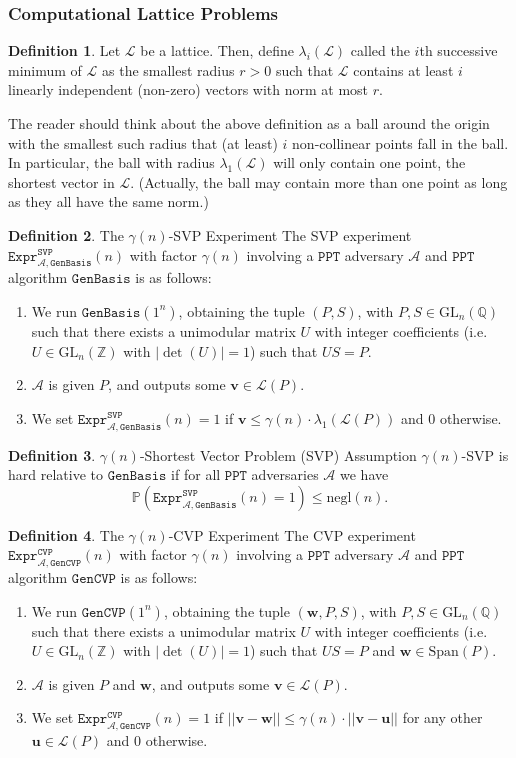 \documentclass{article}
\theoremstyle{definition}
\newtheorem{definition}{Definition}[section]
\theoremstyle{example}
\newcommand{\A}{\mathcal{A}}
\renewcommand{\L}{\mathcal{L}}
\newcommand{\Prob}{\mathbb{P}}
\newcommand{\Int}{\mathbb{Z}}
\newcommand{\Rat}{\mathbb{Q}}
\newcommand{\GL}{\text{GL}}
\newcommand{\Span}{\text{Span}}
\newcommand{\PPT}{\texttt{PPT}}
\newcommand{\negl}{\text{negl}}
\newcommand{\Expr}[2]{\texttt{Expr}^{\texttt{#1}}_{#2}}
\newcommand{\GenBasis}{\texttt{GenBasis}}
\newcommand{\GenCVP}{\texttt{GenCVP}}
\renewcommand{\vec}[1]{\mathbf{#1}}
\newcommand{\norm}[1]{||#1||}
\begin{document}
\subsubsection{Computational Lattice Problems}
\label{sec:comp_lattice_prob}
\begin{definition}
  Let $\L$ be a lattice. Then, define $\lambda_i(\L)$ called the $i$th
  successive minimum of $\L$ as the smallest radius $r > 0 $ such that $\L$
  contains at least $i$ linearly independent (non-zero) vectors with norm at most $r$.
\end{definition}
The reader should think about the above definition as a ball around the origin
with the smallest such radius that (at least) $i$ non-collinear points fall in
the ball. In particular, the ball with radius $\lambda_1(\L)$ will only contain
one point, the shortest vector in $\L$. (Actually, the ball may contain more
than one point as long as they all have the same norm.)
\begin{definition}{The $\gamma(n)$-SVP Experiment} The SVP experiment
  $\Expr{SVP}{\A, \GenBasis}(n)$ with factor $\gamma(n)$ involving a $\PPT$ adversary $\A$ and
  $\PPT$ algorithm $\GenBasis$ is as follows:
  \begin{enumerate}
  \item We run $\GenBasis(1^n)$, obtaining the tuple $(P, S)$, with $P, S \in
    \GL_n(\Rat)$ such that there exists a unimodular matrix $U$ with integer
    coefficients (i.e. $U \in \GL_n(\Int)$ with $|\det(U)| = 1$) such that $US =
    P$.
  \item $\A$ is given $P$, and outputs some $\vec{v} \in \L(P)$.
  \item We set $\Expr{SVP}{\A, \GenBasis}(n) = 1$ if $\vec{v} \leq \gamma(n)
    \cdot \lambda_1(\L(P))$ and $0$ otherwise.
  \end{enumerate}
\end{definition}
\begin{definition}{$\gamma(n)$-Shortest Vector Problem (SVP) Assumption}
  $\gamma(n)$-SVP is hard relative to $\GenBasis$ if for all $\PPT$ adversaries $\A$ we
  have
  \[
    \Prob(\Expr{SVP}{\A, \GenBasis}(n) = 1) \leq \negl(n).
  \]
\end{definition}
\begin{definition}{The $\gamma(n)$-CVP Experiment} The CVP experiment
  $\Expr{CVP}{\A, \GenCVP}(n)$ with factor $\gamma(n)$ involving a $\PPT$ adversary $\A$ and
  $\PPT$ algorithm $\GenCVP$ is as follows:
  \begin{enumerate}
  \item We run $\GenCVP(1^n)$, obtaining the tuple $(\vec{w}, P, S)$, with $P, S \in
    \GL_n(\Rat)$ such that there exists a unimodular matrix $U$ with integer
    coefficients (i.e. $U \in \GL_n(\Int)$ with $|\det(U)| = 1$) such that $US =
    P$ and $\vec{w} \in \Span(P)$.
  \item $\A$ is given $P$ and $\vec{w}$, and outputs some $\vec{v} \in \L(P)$.
  \item We set $\Expr{CVP}{\A, \GenCVP}(n) = 1$ if $\norm{\vec{v} - \vec{w}} \leq \gamma(n)
    \cdot \norm{\vec{v} - \vec{u}}$ for any other $\vec{u} \in \L(P)$ and $0$ otherwise.
  \end{enumerate}
\end{definition}
\end{document}
